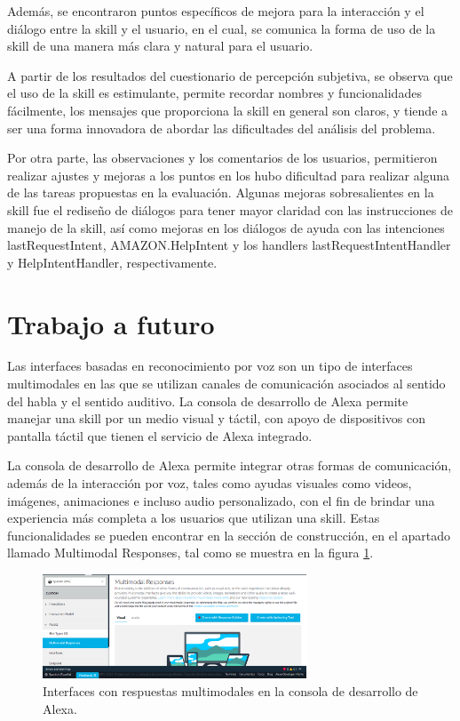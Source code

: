Además, se encontraron puntos específicos de mejora para la interacción y el diálogo entre la skill y el usuario, en el cual, se comunica la forma de uso de la skill de una manera más clara y natural para el usuario.

A partir de los resultados del cuestionario de percepción subjetiva, se observa que el uso de la skill es estimulante, permite recordar nombres y funcionalidades fácilmente, los mensajes que proporciona la skill en general son claros, y tiende a ser una forma innovadora de abordar las dificultades del análisis del problema.

Por otra parte, las observaciones y los comentarios de los usuarios, permitieron realizar ajustes y mejoras a los puntos en los hubo dificultad para realizar alguna de las tareas propuestas en la evaluación. Algunas mejoras sobresalientes en la skill fue el rediseño de diálogos para tener mayor claridad con las instrucciones de manejo de la skill, así como mejoras en los diálogos de ayuda con las intenciones lastRequestIntent, AMAZON.HelpIntent y los handlers lastRequestIntentHandler y HelpIntentHandler, respectivamente.


\section{Trabajo a futuro}
\label{TrabajoFuturocapV}

Las interfaces basadas en reconocimiento por voz son un tipo de interfaces multimodales en las que se utilizan canales de comunicación asociados al sentido del habla y el sentido auditivo. La consola de desarrollo de Alexa permite manejar una skill por un medio visual y táctil, con apoyo de dispositivos con pantalla táctil que tienen el servicio de Alexa integrado.

La consola de desarrollo de Alexa permite integrar otras formas de comunicación, además de la interacción por voz, tales como ayudas visuales como videos, imágenes, animaciones e incluso audio personalizado, con el fin de brindar una experiencia más completa a los usuarios que utilizan una skill. Estas funcionalidades se pueden encontrar en la sección de construcción, en el apartado llamado Multimodal Responses, tal como se muestra en la figura \ref{fig:51}.

\begin{figure}
  \centering
  \includegraphics[width=0.70\textwidth]{Cap5/Figuras/AlexaMultimodalResponses.png}
  \caption{Interfaces con respuestas multimodales en la consola de desarrollo de Alexa.}
  \label{fig:51}
\end{figure}

